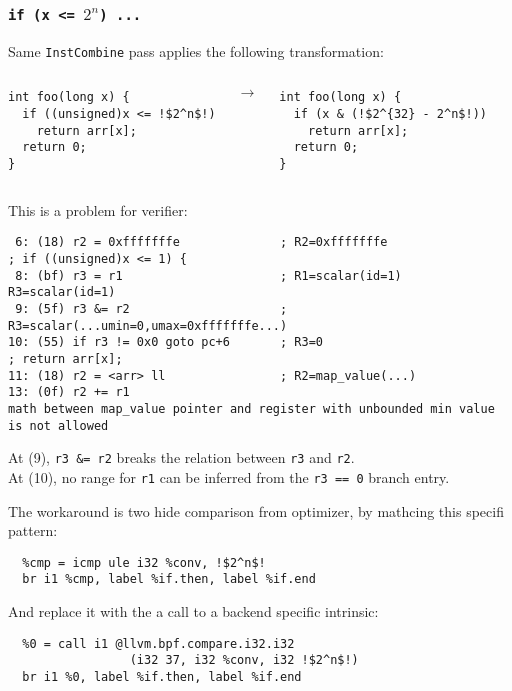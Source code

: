 \documentclass{beamer}
\newcommand{\code}[1]{\texttt{#1}}
\begin{document}
\begin{frame}
  \frametitle{\code{if (x <= $2^n$) ...}}

Same \code{InstCombine} pass applies the following transformation:

  \vspace{1cm}

  \begin{columns}
    \hspace{0.5cm}
    \begin{minipage}{\textwidth}
      \begin{verbatim}
int foo(long x) {
  if ((unsigned)x <= !$2^n$!)
    return arr[x];
  return 0;
}
      \end{verbatim}
    \end{minipage}
    $\rightarrow$
    \begin{minipage}{\textwidth}
      \begin{verbatim}
int foo(long x) {
  if (x & (!$2^{32} - 2^n$!))
    return arr[x];
  return 0;
}
      \end{verbatim}
    \end{minipage}
  \end{columns}

  \framebreak
  
  This is a problem for verifier:

  \begin{verbatim}
 6: (18) r2 = 0xfffffffe              ; R2=0xfffffffe
; if ((unsigned)x <= 1) {
 8: (bf) r3 = r1                      ; R1=scalar(id=1) R3=scalar(id=1)
 9: (5f) r3 &= r2                     ; R3=scalar(...umin=0,umax=0xfffffffe...)
10: (55) if r3 != 0x0 goto pc+6       ; R3=0
; return arr[x];
11: (18) r2 = <arr> ll                ; R2=map_value(...)
13: (0f) r2 += r1
math between map_value pointer and register with unbounded min value is not allowed
  \end{verbatim}

At (9), \code{r3 \&= r2} breaks the relation between \code{r3} and \code{r2}.\\
At (10), no range for \code{r1} can be inferred from the \code{r3 == 0} branch entry.

  \framebreak

  The workaround is two hide comparison from optimizer, by mathcing
  this specifi pattern:

\begin{verbatim}
  %cmp = icmp ule i32 %conv, !$2^n$!
  br i1 %cmp, label %if.then, label %if.end
\end{verbatim}

And replace it with the a call to a backend specific intrinsic:

\begin{verbatim}
  %0 = call i1 @llvm.bpf.compare.i32.i32
                 (i32 37, i32 %conv, i32 !$2^n$!)
  br i1 %0, label %if.then, label %if.end
\end{verbatim}
  
\end{frame}
\end{document}

